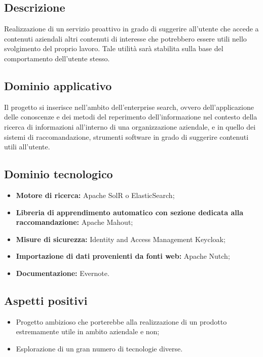 \documentclass[openany,12pt,a4paper]{report}
\begin{document}
\subsection{Descrizione}

Realizzazione di un servizio proattivo in grado di suggerire all’utente che accede a contenuti aziendali altri contenuti di interesse che potrebbero essere utili nello svolgimento del proprio lavoro. Tale utilità sarà stabilita sulla base del comportamento dell’utente stesso.

\subsection{Dominio applicativo}

Il progetto si inserisce nell'ambito dell'enterprise search, ovvero dell’applicazione delle conoscenze e dei metodi del reperimento dell’informazione nel contesto della ricerca di informazioni all’interno di una organizzazione aziendale, e in quello dei sistemi di raccomandazione, strumenti software in grado di suggerire contenuti utili all’utente.

\subsection{Dominio tecnologico}

\begin{itemize}
    \item \textbf{Motore di ricerca:} Apache SolR o ElasticSearch;
    
    \item \textbf{Libreria di apprendimento automatico con sezione dedicata alla raccomandazione:} Apache Mahout;
    
    \item \textbf{Misure di sicurezza:} Identity and Access Management Keycloak;
    
    \item \textbf{Importazione di dati provenienti da fonti web:} Apache Nutch;
    
    \item \textbf{Documentazione:} Evernote.
\end{itemize}

\subsection{Aspetti positivi}

\begin{itemize}
    \item Progetto ambizioso che porterebbe alla realizzazione di un prodotto estremamente utile in ambito aziendale e non;
    
    \item Esplorazione di un gran numero di tecnologie diverse.
\end{itemize}
\end{document}
